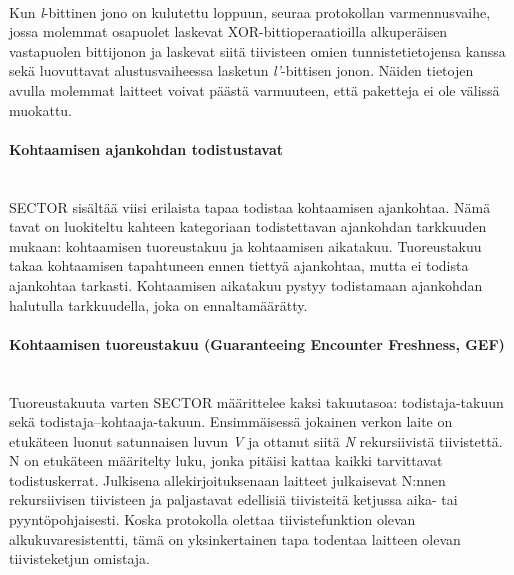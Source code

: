 \documentclass[finnish]{tktltiki2}
\theoremstyle{definition}
\theoremstyle{remark}
\begin{document}
\noindent\\
Kun \emph{l}-bittinen jono on kulutettu loppuun, seuraa protokollan varmennusvaihe, jossa molemmat osapuolet laskevat XOR-bittioperaatioilla alkuperäisen vastapuolen bittijonon ja laskevat siitä tiivisteen omien tunnistetietojensa kanssa sekä luovuttavat alustusvaiheessa lasketun \emph{l'}-bittisen jonon. Näiden tietojen avulla molemmat laitteet voivat päästä varmuuteen, että paketteja ei ole välissä muokattu.

\paragraph{Kohtaamisen ajankohdan todistustavat}
\noindent\\
SECTOR sisältää viisi erilaista tapaa todistaa kohtaamisen ajankohtaa. Nämä tavat on luokiteltu kahteen kategoriaan todistettavan ajankohdan tarkkuuden mukaan: kohtaamisen tuoreustakuu ja kohtaamisen aikatakuu. Tuoreustakuu takaa kohtaamisen tapahtuneen ennen tiettyä ajankohtaa, mutta ei todista ajankohtaa tarkasti. Kohtaamisen aikatakuu pystyy todistamaan ajankohdan halutulla tarkkuudella, joka on ennaltamäärätty. 

\paragraph{Kohtaamisen tuoreustakuu (Guaranteeing Encounter Freshness, GEF)}
\noindent\\
Tuoreustakuuta varten SECTOR määrittelee kaksi takuutasoa: todistaja-takuun sekä todistaja--kohtaaja-takuun. Ensimmäisessä jokainen verkon laite on etukäteen luonut satunnaisen luvun \emph{V} ja ottanut siitä \emph{N} rekursiivistä tiivistettä. N on etukäteen määritelty luku, jonka pitäisi kattaa kaikki tarvittavat todistuskerrat. Julkisena allekirjoituksenaan laitteet julkaisevat N:nnen rekursiivisen tiivisteen ja paljastavat edellisiä tiivisteitä ketjussa aika- tai pyyntöpohjaisesti. Koska protokolla olettaa tiivistefunktion olevan alkukuvaresistentti, tämä on yksinkertainen tapa todentaa laitteen olevan tiivisteketjun omistaja.
\end{document}
